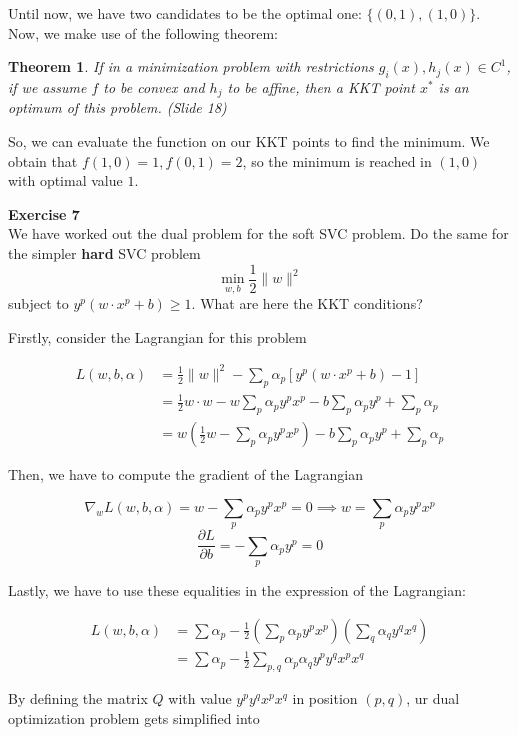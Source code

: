 \documentclass[11pt,table]{article}
\newtheorem{nth}{Theorem}
\newenvironment{problem}[2][Exercise]
    { \begin{mdframed}[backgroundcolor=gray!20] \textbf{#1 #2} \\}
    {  \end{mdframed}}
\newcommand\norm[1]{\lVert#1\rVert}
\begin{document}
Until now, we have two candidates to be the optimal one: \(\{(0,1),(1,0)\}\). Now, we make use of the following theorem:

\begin{nth}
If in a minimization problem with restrictions \(g_i(x), h_j(x) \in C^1\), if we assume \(f\) to be convex and \(h_j\) to be affine, then a KKT point \(x^*\) is an optimum of this problem. (Slide 18)
\end{nth}

So, we can evaluate the function on our KKT points to find the minimum. We obtain that \(f(1,0) = 1, f(0,1) = 2\), so the minimum is reached in \((1,0)\) with optimal value \(1\). 

\begin{problem}{7}
	We have worked out the dual problem for the soft SVC problem. Do the same for the simpler \textbf{hard} SVC problem
	\[
	\min_{w,b} \frac{1}{2} \norm{w}^2  
	\]
	subject to \(y^p\left(w \cdot x^p + b\right) \geq 1\). What are here the KKT conditions?
\end{problem}

Firstly, consider the Lagrangian for this problem

\begin{align*}
L(w,b,\alpha) & = \frac{1}{2} \norm{w}^2 - \sum_p \alpha_p \left[ y^p \left(w \cdot x^p +b\right) -1 \right]\\
& = \frac{1}{2} w \cdot w - w \sum_p \alpha_p y^p  x^p - b \sum_p \alpha_p y^p + \sum_p \alpha_p \\
& = w \left(\frac{1}{2}w -\sum_p \alpha_p y^p  x^p \right) - b \sum_p \alpha_p y^p + \sum_p \alpha_p
\end{align*}

Then, we have to compute the gradient of the Lagrangian

\[
	\nabla_w L(w,b,\alpha) = w - \sum_p \alpha_p y^p x^p = 0 \implies w = \sum_p \alpha_p y^p x^p
\]
\[
	\frac{\partial L}{\partial b} = - \sum_p \alpha_p y^p = 0  
\]

Lastly, we have to use these equalities in the expression of the Lagrangian:

\begin{align*}
	L(w,b,\alpha) & = \sum \alpha_p - \frac{1}{2}\left(\sum_p \alpha_p y^p x^p\right)\left(\sum_q \alpha_q y^q x^q\right) \\
	& = \sum \alpha_p - \frac{1}{2} \sum_{p,q} \alpha_p \alpha_q y^p y^q x^p x^q
\end{align*}

By defining the matrix \(Q\) with value \(y^p y^q x^p x^q\) in position \((p,q)\), ur dual optimization problem gets simplified into
\end{document}
